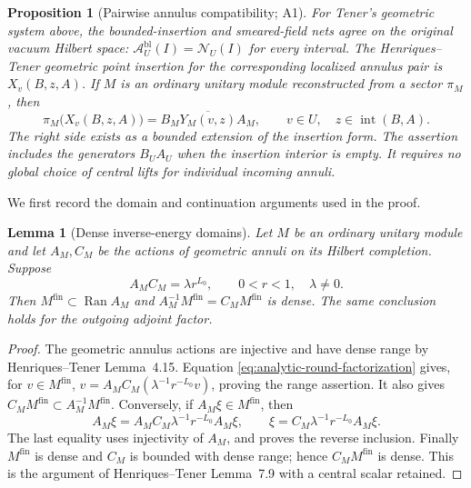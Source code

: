 \documentclass[11pt,a4paper]{article}
\newtheorem{lemma}[theorem]{Lemma}
\newtheorem{proposition}[theorem]{Proposition}
\theoremstyle{definition}
\begin{document}
\begin{proposition}[Pairwise annulus compatibility; A1]
\label{clm:analytic-annulus}
For Tener's geometric system above, the bounded-insertion and
smeared-field nets agree on the original vacuum Hilbert space:
$\mathcal A_U^{\mathrm{bl}}(I)=\mathcal N_U(I)$ for every interval.
The Henriques--Tener geometric point insertion for the corresponding
localized annulus pair is $X_v(B,z,A)$.  If $M$ is an ordinary
unitary module reconstructed from a sector $\pi_M$, then
\begin{equation}
 \pi_M\bigl(X_v(B,z,A)\bigr)
   =\overline{B_MY_M(v,z)A_M},
 \qquad v\in U,\quad z\in\operatorname{int}(B,A).
 \label{eq:analytic-annulus-identity}
\end{equation}
The right side exists as a bounded extension of the insertion form.
The assertion includes the generators $B_UA_U$ when the insertion
interior is empty.  It requires no global choice of central lifts for
individual incoming annuli.
\end{proposition}

We first record the domain and continuation arguments used in the proof.

\begin{lemma}[Dense inverse-energy domains]
\label{lem:analytic-inverse-domain}
Let $M$ be an ordinary unitary module and let $A_M,C_M$ be the actions
of geometric annuli on its Hilbert completion.  Suppose
\begin{equation}
 A_MC_M=\lambda r^{L_0},\qquad 0<r<1,\quad\lambda\ne0.
 \label{eq:analytic-round-factorization}
\end{equation}
Then $M^{\mathrm{fin}}\subset\operatorname{Ran}A_M$ and
$A_M^{-1}M^{\mathrm{fin}}=C_M M^{\mathrm{fin}}$ is dense.
The same conclusion holds for the outgoing adjoint factor.
\end{lemma}
\begin{proof}
The geometric annulus actions are injective and have dense range by
Henriques--Tener Lemma~4.15.  Equation
\eqref{eq:analytic-round-factorization} gives, for $v\in M^{\mathrm{fin}}$,
$v=A_MC_M(\lambda^{-1}r^{-L_0}v)$, proving the range assertion.
It also gives
$C_M M^{\mathrm{fin}}\subset A_M^{-1}M^{\mathrm{fin}}$.
Conversely, if $A_M\xi\in M^{\mathrm{fin}}$, then
\[
 A_M\xi
  =A_MC_M\lambda^{-1}r^{-L_0}A_M\xi,
 \qquad
 \xi=C_M\lambda^{-1}r^{-L_0}A_M\xi.
\]
The last equality uses injectivity of $A_M$, and proves the reverse
inclusion.  Finally $M^{\mathrm{fin}}$ is dense and $C_M$ is bounded
with dense range; hence $C_M M^{\mathrm{fin}}$ is dense.  This is the
argument of Henriques--Tener Lemma~7.9 with a central scalar retained.
\end{proof}
\end{document}
